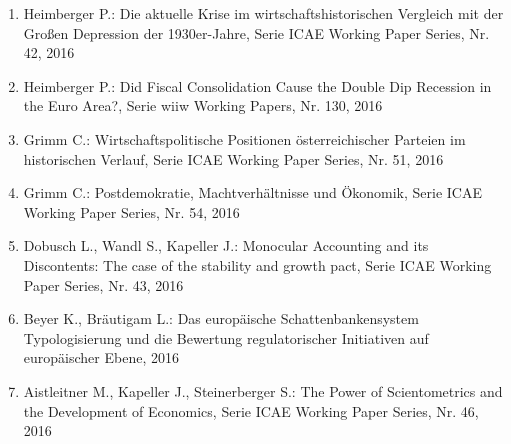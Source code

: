 \begin{enumerate}
	 \item Heimberger P.: Die aktuelle Krise im wirtschaftshistorischen Vergleich mit der Großen Depression der 1930er-Jahre, Serie ICAE Working Paper Series, Nr. 42, 2016
	 \item Heimberger P.: Did Fiscal Consolidation Cause the Double Dip Recession in the Euro Area?, Serie wiiw Working Papers, Nr. 130, 2016
	 \item Grimm C.: Wirtschaftspolitische Positionen österreichischer Parteien im historischen Verlauf, Serie ICAE Working Paper Series, Nr. 51, 2016
	 \item Grimm C.: Postdemokratie, Machtverhältnisse und Ökonomik, Serie ICAE Working Paper Series, Nr. 54, 2016
	 \item Dobusch L., Wandl S., Kapeller J.: Monocular Accounting and its Discontents: The case of the stability and growth pact, Serie ICAE Working Paper Series, Nr. 43, 2016
	 \item Beyer K., Bräutigam L.: Das europäische Schattenbankensystem Typologisierung und die Bewertung regulatorischer Initiativen auf europäischer Ebene, 2016
	 \item Aistleitner M., Kapeller J., Steinerberger S.: The Power of Scientometrics and the Development of Economics, Serie ICAE Working Paper Series, Nr. 46, 2016
\end{enumerate}
